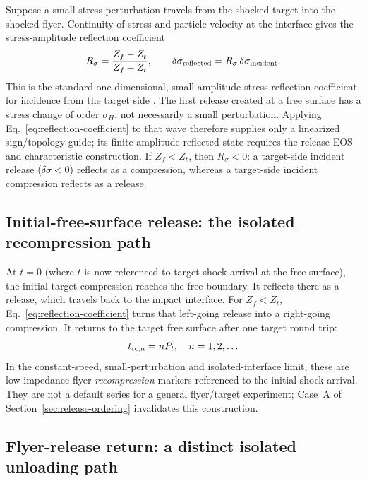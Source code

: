 \documentclass[11pt]{article}
\newcommand{\sig}{\sigma}
\newcommand{\Pt}{P_t}
\begin{document}
Suppose a small stress perturbation travels from the shocked target into the
shocked flyer.  Continuity of stress and particle velocity at the interface
gives the stress-amplitude reflection coefficient
\begin{equation}
  R_\sig=\frac{Z_f-Z_t}{Z_f+Z_t},
  \qquad
  \delta\sig_{\rm reflected}=R_\sig\,\delta\sig_{\rm incident}.
  \label{eq:reflection-coefficient}
\end{equation}
This is the standard one-dimensional, small-amplitude stress reflection
coefficient for incidence from the target side \cite{Davison2008}.
The first release created at a free surface has a stress change of order
$\sig_H$, not necessarily a small perturbation.  Applying
Eq.~\eqref{eq:reflection-coefficient} to that wave therefore supplies only a
linearized sign/topology guide; its finite-amplitude reflected state requires
the release EOS and characteristic construction.
If $Z_f<Z_t$, then $R_\sig<0$: a target-side incident release
($\delta\sig<0$) reflects as a compression, whereas a target-side incident
compression reflects as a release.

\subsection{Initial-free-surface release: the isolated recompression path}

At $t=0$ (where $t$ is now referenced to target shock arrival at the free
surface), the initial target compression reaches the free boundary.  It
reflects there as a release, which travels back to the impact interface.  For
$Z_f<Z_t$, Eq.~\eqref{eq:reflection-coefficient} turns that left-going release
into a right-going compression.  It returns to the target free surface after
one target round trip:
\begin{equation}
  t_{\rm rc,n}=n\Pt,\quad n=1,2,\ldots
  \label{eq:initial-fs-reverberation}
\end{equation}
In the constant-speed, small-perturbation and isolated-interface limit, these
are low-impedance-flyer \emph{recompression} markers referenced to the initial
shock arrival.  They are not a default series for a general flyer/target
experiment; Case~A of Section~\ref{sec:release-ordering} invalidates this
construction.

\subsection{Flyer-release return: a distinct isolated unloading path}
\end{document}
